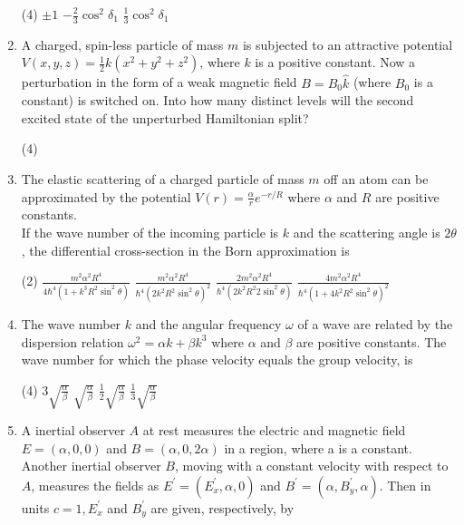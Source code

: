 \begin{enumerate}
 \begin{tasks}(4)
	\task[\textbf{b.}] $\pm 1$
	\task[\textbf{c.}]$-\frac{2}{3} \cos ^{2} \delta_{1}$
	\task[\textbf{d.}]  $\frac{1}{3} \cos ^{2} \delta_{1}$
\end{tasks}
\item A charged, spin-less particle of mass $m$ is subjected to an attractive potential $V(x, y, z)=\frac{1}{2} k\left(x^{2}+y^{2}+z^{2}\right)$, where $k$ is a positive constant. Now a perturbation in the form of a weak magnetic field $B=B_{0} \hat{k}$ (where $B_{0}$ is a constant) is switched on. Into how many distinct levels will the second excited state of the unperturbed Hamiltonian split?
 \begin{tasks}(4)
\end{tasks}
\item  The elastic scattering of a charged particle of mass $m$ off an atom can be approximated by the potential $V(r)=\frac{\alpha}{r} e^{-r / R}$ where $\alpha$ and $R$ are positive constants.\\
If the wave number of the incoming particle is $k$ and the scattering angle is $2 \theta$, the differential cross-section in the Born approximation is
 \begin{tasks}(2)
	\task[\textbf{a.}]$\frac{m^{2} \alpha^{2} R^{4}}{4 \hbar^{4}\left(1+k^{3} R^{2} \sin ^{2} \theta\right)}$
	\task[\textbf{b.}]$\frac{m^{2} \alpha^{2} R^{4}}{\hbar^{4}\left(2 k^{2} R^{2} \sin ^{2} \theta\right)^{2}}$
	\task[\textbf{c.}] $\frac{2 m^{2} \alpha^{2} R^{4}}{\hbar^{4}\left(2 k^{2} R^{2} 2 \sin ^{2} \theta\right)}$
	\task[\textbf{d.}] $\frac{4 m^{2} \alpha^{2} R^{4}}{\hbar^{4}\left(1+4 k^{2} R^{2} \sin ^{2} \theta\right)^{2}}$
\end{tasks}
\item  The wave number $k$ and the angular frequency $\omega$ of a wave are related by the dispersion relation $\omega^{2}=\alpha k+\beta k^{3}$ where $\alpha$ and $\beta$ are positive constants. The wave number for which the phase velocity equals the group velocity, is
 \begin{tasks}(4)
	\task[\textbf{a.}]$3 \sqrt{\frac{\alpha}{\beta}}$
	\task[\textbf{b.}]$\sqrt{\frac{\alpha}{\beta}}$
	\task[\textbf{c.}]$\frac{1}{2} \sqrt{\frac{\alpha}{\beta}}$
	\task[\textbf{d.}] $\frac{1}{3} \sqrt{\frac{\alpha}{\beta}}$
\end{tasks}
\item  A inertial observer $A$ at rest measures the electric and magnetic field $E=(\alpha, 0,0)$ and $B=(\alpha, 0,2 \alpha)$ in a region, where a is a constant. Another inertial observer $B$, moving with a constant velocity with respect to $A$, measures the fields as $E^{\prime}=\left(E_{x}^{\prime}, \alpha, 0\right)$ and $B^{\prime}=\left(\alpha, B_{y}^{\prime}, \alpha\right)$. Then in units $c=1, E_{x}^{\prime}$ and $B_{y}^{\prime}$ are given, respectively, by

\end{enumerate}
